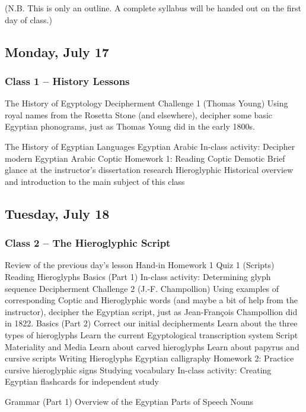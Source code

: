 \documentclass[11pt]{article}
\begin{document}
	(N.B. This is only an outline. 
	A complete syllabus will be handed out on the first day of class.)

	\subsection*{Monday, July 17}
		\subsubsection*{Class 1 -- History Lessons}
			\begin{outline}[itemize]
				\1 The History of Egyptology
					\2 Decipherment Challenge 1 (Thomas Young)
						\3 Using royal names from the Rosetta Stone (and elsewhere), 
							decipher some basic Egyptian phonograms, 
							just as Thomas Young did in the early 1800s.
				
				\1 The History of Egyptian Languages
					\2 Egyptian Arabic
						\3 In-class activity: Decipher modern Egyptian Arabic
					\2 Coptic
						\3 Homework 1: Reading Coptic
					\2 Demotic
						\3 Brief glance at the instructor's dissertation research
					\2 Hieroglyphic
						\3 Historical overview and introduction to the main subject of this class
			\end{outline}
			
	\subsection*{Tuesday, July 18}
		\subsubsection*{Class 2 -- The Hieroglyphic Script}
			\begin{outline}[itemize]
				\1 Review of the previous day's lesson
					\2 Hand-in Homework 1
					\2 Quiz 1 (Scripts)
				\1 Reading Hieroglyphs
					\2 Basics (Part 1)
						\3 In-class activity: Determining glyph sequence
					\2 Decipherment Challenge 2 (J.-F. Champollion)
						\3 Using examples of corresponding Coptic and Hieroglyphic words (and maybe a bit of help from the instructor), 
							decipher the Egyptian script, 
							just as Jean-Fran\c{c}ois Champollion did in 1822.
					\2 Basics (Part 2)
						\3 Correct our initial decipherments
						\3 Learn about the three types of hieroglyphs
						\3 Learn the current Egyptological transcription system
					\2 Script Materiality and Media
						\3 Learn about carved hieroglyphs
						\3 Learn about papyrus and cursive scripts
				\1 Writing Hieroglyphs
					\2 Egyptian calligraphy
						\3 Homework 2: Practice cursive hieroglyphic signs
					\2 Studying vocabulary
						\3 In-class activity: Creating Egyptian flashcards for independent study
				
				\1 Grammar (Part 1)
					\2 Overview of the Egyptian Parts of Speech
					\2 Nouns
			\end{outline}
			
\end{document}

